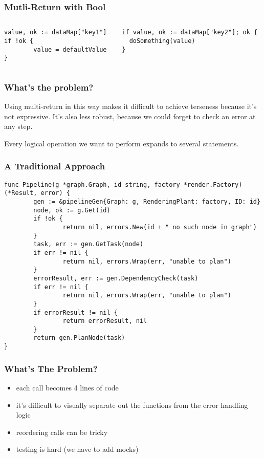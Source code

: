 \documentclass{beamer}
\begin{document}
\begin{frame}[fragile]
  \frametitle{Mutli-Return with Bool}
  \begin{columns}[T]
    \begin{column}{.48\textwidth}
\begin{lstlisting}
value, ok := dataMap["key1"]
if !ok {
        value = defaultValue
}
\end{lstlisting}
    \end{column}
    \hfill
    \begin{column}{.48\textwidth}
\begin{lstlisting}
if value, ok := dataMap["key2"]; ok {
  doSomething(value)
}
\end{lstlisting}
    \end{column}
  \end{columns}
\end{frame}

\begin{frame}
  \frametitle{What's the problem?}
  Using multi-return in this way makes it difficult to achieve
  terseness because it's not expressive.  It's also less robust,
  because we could forget to check an error at any step.

  \vfill

  Every logical operation we want to perform expands to several
  statements.
\end{frame}

\begin{frame}[fragile]
  \frametitle{A Traditional Approach}
\begin{lstlisting}
func Pipeline(g *graph.Graph, id string, factory *render.Factory) (*Result, error) {
        gen := &pipelineGen{Graph: g, RenderingPlant: factory, ID: id}
        node, ok := g.Get(id)
        if !ok {
                return nil, errors.New(id + " no such node in graph")
        }
        task, err := gen.GetTask(node)
        if err != nil {
                return nil, errors.Wrap(err, "unable to plan")
        }
        errorResult, err := gen.DependencyCheck(task)
        if err != nil {
                return nil, errors.Wrap(err, "unable to plan")
        }
        if errorResult != nil {
                return errorResult, nil
        }
        return gen.PlanNode(task)
}
\end{lstlisting}
\end{frame}

\begin{frame}
  \frametitle{What's The Problem?}
  \begin{itemize}
    \item each call becomes 4 lines of code
    \item it's difficult to visually separate out the functions from the error handling logic
    \item reordering calls can be tricky
    \item testing is hard (we have to add mocks)
  \end{itemize}
\end{frame}
\end{document}
